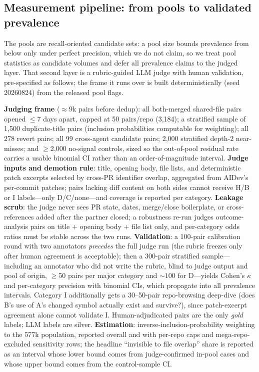 \documentclass{article}
\begin{document}
\subsection{Measurement pipeline: from pools to validated prevalence}
\label{sec:pipeline}

The pools are recall-oriented candidate sets: a pool size bounds prevalence from below only under perfect precision, which we do not claim, so we treat pool statistics as candidate volumes and defer all prevalence claims to the judged layer. That second layer is a rubric-guided LLM judge with human validation, pre-specified as follows; the frame it runs over is built deterministically (seed 20260824) from the released pool flags.

\textbf{Judging frame} ($\approx$9k pairs before dedup): all both-merged shared-file pairs opened $\leq$7 days apart, capped at 50 pairs/repo (3{,}184); %
a stratified sample of 1{,}500 duplicate-title pairs (inclusion probabilities computable for weighting); all 278 revert pairs; all 99 cross-agent candidate pairs; 2{,}000 stratified depth-2 near-misses; and $\geq$2{,}000 no-signal controls, sized so the out-of-pool residual rate carries a usable binomial CI rather than an order-of-magnitude interval.
\textbf{Judge inputs and demotion rule}: title, opening body, file lists, and deterministic patch excerpts selected by cross-PR identifier overlap, aggregated from AIDev's per-commit patches; pairs lacking diff content on both sides cannot receive H/B or I labels---only D/C/none---and coverage is reported per category.
\textbf{Leakage scrub}: the judge never sees PR state, dates, merge/close boilerplate, or cross-references added after the partner closed; a robustness re-run judges outcome-analysis pairs on title + opening body + file list only, and per-category odds ratios must be stable across the two runs.
\textbf{Validation}: a 100-pair calibration round with two annotators \emph{precedes} the full judge run (the rubric freezes only after human agreement is acceptable); then a 300-pair stratified sample---including an annotator who did not write the rubric, blind to judge output and pool of origin, $\geq$50 pairs per major category and ${\sim}100$ for D---yields Cohen's $\kappa$ and per-category precision with binomial CIs, which propagate into all prevalence intervals. Category I additionally gets a 30--50-pair repo-browsing deep-dive (does B's use of A's changed symbol actually exist and survive?), since patch-excerpt agreement alone cannot validate I. Human-adjudicated pairs are the only \emph{gold} labels; LLM labels are silver.
\textbf{Estimation}: inverse-inclusion-probability weighting to the 577k population, reported overall and with per-repo caps and mega-repo-excluded sensitivity rows; the headline ``invisible to file overlap'' share is reported as an interval whose lower bound comes from judge-confirmed in-pool cases and whose upper bound comes from the control-sample CI.
\end{document}
